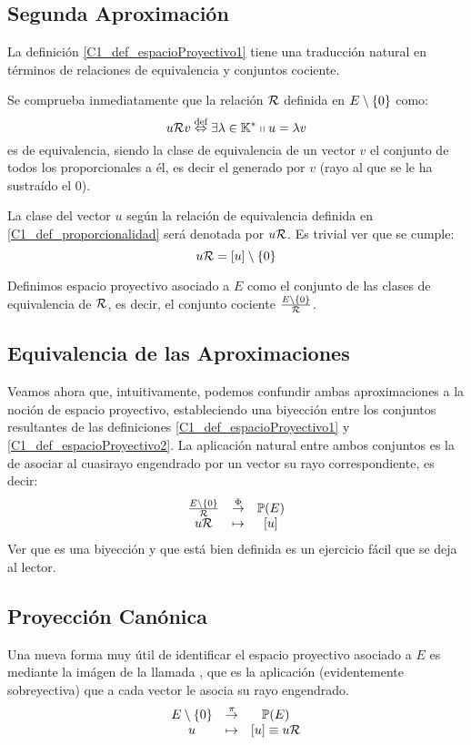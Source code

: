 \subsection{Segunda Aproximación}
\label{C1_S1_segundaAprox}
La definición \ref{C1_def_espacioProyectivo1} tiene una traducción natural en términos de relaciones de equivalencia y conjuntos cociente.
\begin{defi}
	\label{C1_def_proporcionalidad}
	Se comprueba inmediatamente que la relación $\mathcal{R}$ definida en $E\setminus\{0\}$ como:
	\[u\mathcal{R}v\stackrel{\textrm{def}}{\Leftrightarrow} \exists \lambda\in\mathbb{K}^*\shortparallel u = \lambda v\]
	es de equivalencia, siendo la clase de equivalencia de un vector $v$ el conjunto de todos los proporcionales a él, es decir el  generado por $v$ (rayo al que se le ha sustraído el $0$).
\end{defi}
La clase del vector $u$ según la relación de equivalencia definida en \ref{C1_def_proporcionalidad} será denotada por $u\mathcal{R}$. Es trivial ver que se cumple:
\[u\mathcal{R}=\left [ u \right ]\setminus\{0\}\]
\begin{defi}
	\label{C1_def_espacioProyectivo2}
	Definimos espacio proyectivo asociado a $E$ como el conjunto de las clases de equivalencia de $\mathcal{R}$, es decir, el conjunto cociente $\frac{E\setminus\{0\}}{\mathcal{R}}$.
\end{defi}
\subsection{Equivalencia de las Aproximaciones}
\label{C1_S1_equivalenciaAprox}
Veamos ahora que, intuitivamente, podemos confundir ambas aproximaciones a la noción de espacio proyectivo, estableciendo una biyección entre los conjuntos resultantes de las definiciones \ref{C1_def_espacioProyectivo1} y \ref{C1_def_espacioProyectivo2}. La aplicación natural entre ambos conjuntos es la de asociar al cuasirayo engendrado por un vector su rayo correspondiente, es decir:
\begin{equation}
\label{C1_eq_indentificacionNociones}
	\begin{array}{ccc}
	\frac{E\setminus\{0\}}{\mathcal{R}} & \stackrel{\Phi}{\to} & \mathbb{P}(E)\\
	u\mathcal{R} & \mapsto & \left [ u \right ]
	\end{array}
\end{equation}
Ver que es una biyección y que está bien definida es un ejercicio fácil que se deja al lector.
\subsection{Proyección Canónica}
\label{C1_S1_proyeccionCanonica}
Una nueva forma muy útil de identificar el espacio proyectivo asociado a $E$ es mediante la imágen de la llamada , que es la aplicación (evidentemente sobreyectiva) que a cada vector le asocia su rayo engendrado.
\begin{equation}
\label{C1_eq_proyeccionCanonica}
	\begin{array}{ccc}
	E\setminus\{0\} & \stackrel{\pi}{\to} & \mathbb{P}(E)\\
	u & \mapsto & \left [ u \right ]\equiv u\mathcal{R}
	\end{array}
\end{equation}
